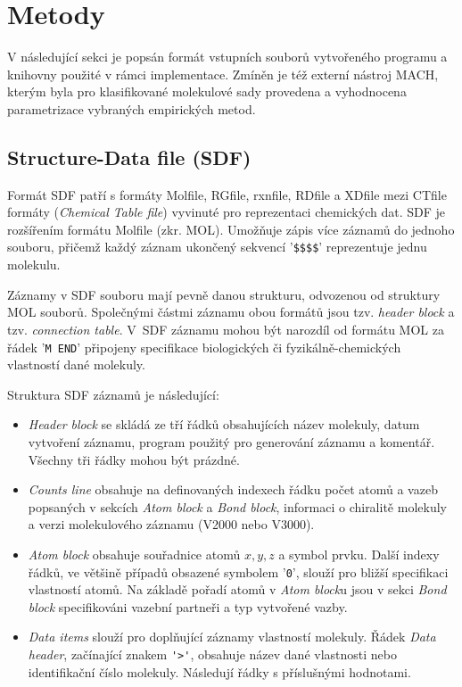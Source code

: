 \chapter{Metody}
V následující sekci je popsán formát vstupních souborů vytvořeného programu a kni\-hov\-ny použité v rámci implementace. Zmíněn je  též externí nástroj MACH, kterým byla pro klasifikované molekulové sady provedena a vyhodnocena parametrizace vybraných empirických metod. 

\section{Structure-Data file (SDF)}
Formát SDF \cite{sdf_pdf, sdf_clanek} patří s formáty Molfile, RGfile, rxnfile, RDfile a XDfile mezi CTfile formáty (\textit{Chemical Table file})  vyvinuté pro reprezentaci chemických dat. SDF je rozšířením formátu Molfile (zkr. MOL). 
Umožňuje zápis více záznamů do jednoho souboru, přičemž každý záznam ukončený sekvencí '\verb|$$$$|' reprezentuje jednu molekulu. 

Záznamy v SDF souboru mají pevně danou strukturu, odvozenou od struktury MOL souborů. Společnými  částmi záznamu obou formátů jsou tzv. \textit{header block} a tzv. \textit{connection table}. %
V~SDF záznamu mohou být narozdíl od formátu MOL za řádek '\verb|M END|' připojeny specifikace biologických či fyzikálně-che\-mic\-kých vlastností dané molekuly. 

Struktura SDF záznamů je následující:
\begin{itemize}
    \item \textit{Header block} se skládá ze tří řádků obsahujících název molekuly, datum vytvoření záznamu, program použitý pro generování záznamu a komentář. 
    Všechny tři řádky mohou být prázdné.
    \item \textit{Counts line} obsahuje na definovaných indexech řádku počet atomů a vazeb  popsaných v sekcích \textit{Atom block} a \textit{Bond block}, informaci o chiralitě molekuly a verzi molekulového záznamu (V2000 nebo V3000).
    \item \textit{Atom block} obsahuje souřadnice atomů  $x, y, z$ a symbol prvku. Další indexy řád\-ků, ve většině případů obsazené symbolem '\verb|0|', slouží pro bližší specifikaci vlastností atomů. Na základě pořadí atomů v \textit{Atom block}u jsou v sekci \textit{Bond block} specifikováni vazební partneři a typ vytvořené vazby. 
    \item \textit{Data items} slouží pro doplňující záznamy vlastností molekuly. Řádek \textit{Data header}, začínající znakem \verb|'>'|, obsahuje název dané vlastnosti nebo identifikační číslo molekuly. Následují řádky s příslušnými hodnotami.
\end{itemize}

